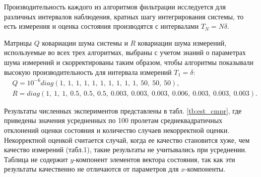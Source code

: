 Производительность каждого из алгоритмов фильтрации исследуется для различных интервалов наблюдения,
кратных шагу интегрирования системы,
то есть измерения и оценка состояния производятся с интервалами $T_N = N\delta$.

Матрицы $Q$ ковариации шума системы и $R$ ковариации шума измерений,
используемые во всех трех алгоритмах,
выбраны с учетом знаний о параметрах шума измерений
и скорректированы таким образом, чтобы алгоритмы показывали
высокую производительность для интервала измерений $T_1 = \delta$:
\begin{equation*} \label{eq:QR}
\begin{aligned}
&Q = 10^{-6} diag(1,\ 1,\ 1,\ 1,\ 1,\ 1,\ 1,\ 1,\ 1,\ 1,\ 50,\ 50,\ 50),\\
&R = diag(1,\ 1,\ 1,\ 0.5,\ 0.5,\ 0.5,\ 0.003,\
0.003,\ 0.003,\ 0.006,\ 0.003,\ 0.003,\ 0.003).
\end{aligned}
\end{equation*}

Результаты численных экспериментов представлены в табл. \ref{tb:est_cmpr},
где приведены значения усредненных по 100 пролетам среднеквадратичных
отклонений оценки состояния
и количество случаев некорректной оценки.
Некорректной оценкой считается случай, когда ее качество становится хуже, чем качество измерений (табл.1),
такие результаты не учитывались при усреднении.
Таблица не содержит $y$-компонент элементов вектора состояния,
так как эти результаты качественно не отличаются от параметров для $x$-компоненты.


